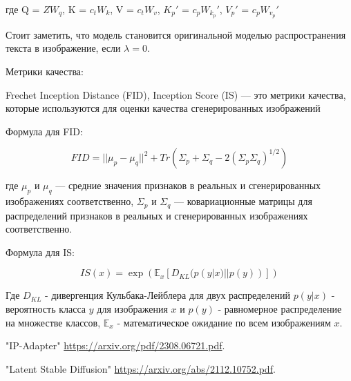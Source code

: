 \documentclass{article}
\begin{document}
где Q = \(ZW_q\), K = \(c_tW_k\), V = \(c_tW_v\), \(K_p'\) = \(c_pW_k_p'\),  \(V_p'\) = \(c_pW_v_p'\)

Стоит заметить, что модель становится оригинальной моделью распространения текста в изображение, если $\lambda = 0$.

Метрики качества:

Frechet Inception Distance (FID), Inception Score (IS) --- это метрики качества, которые используются для оценки качества сгенерированных изображений

Формула для FID:

\begin{equation}
FID = ||\mu_p - \mu_q||^2 + Tr(\Sigma_p + \Sigma_q - 2(\Sigma_p\Sigma_q)^{1/2})
\end{equation}

где \( \mu_p \) и \( \mu_q \) --- средние значения признаков в реальных и сгенерированных изображениях соответственно, \( \Sigma_p \) и \( \Sigma_q \) --- ковариационные матрицы для распределений признаков в реальных и сгенерированных изображениях соответственно.

Формула для IS:

\begin{equation}
IS(x) = \exp(\mathbb{E}_x \left[ D_{KL}(p(y | x) || p(y)) \right] )
\end{equation}

Где \( D_{KL} \) - дивергенция Кульбака-Лейблера для двух распределений \(p(y|x)\) - вероятность класса \(y\) для изображения \(x\) и \(p(y)\) - равномерное распределение на множестве классов, \( \mathbb{E}_x \) - математическое ожидание по всем изображениям \(x\).

\begin{thebibliography}{1}
"IP-Adapter" 
\url{https://arxiv.org/pdf/2308.06721.pdf}.

"Latent Stable Diffusion" 
\url{https://arxiv.org/abs/2112.10752.pdf}.
\end{thebibliography}
\end{document}
